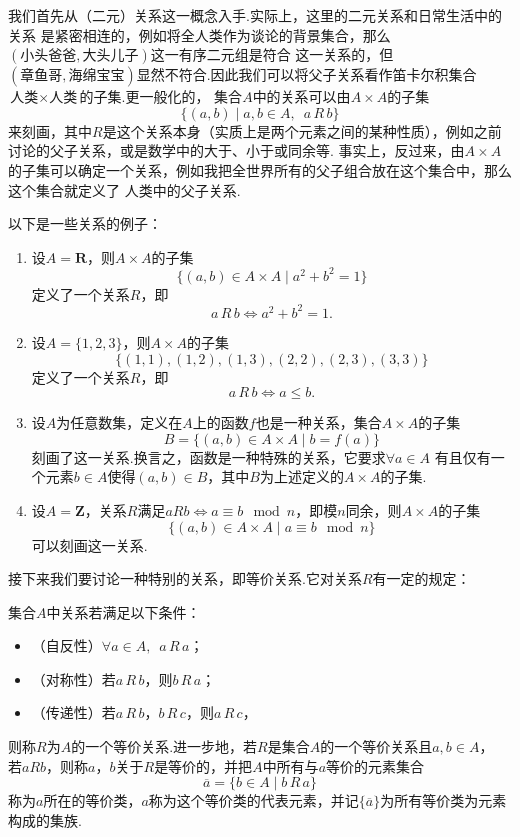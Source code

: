 我们首先从（二元）关系这一概念入手.实际上，这里的二元关系和日常生活中的关系
是紧密相连的，例如将全人类作为谈论的背景集合，那么$(\text{小头爸爸}, \text{大头儿子})$这一有序二元组是符合
这一关系的，但$(\text{章鱼哥}, \text{海绵宝宝})$显然不符合.因此我们可以将父子关系看作笛卡尔积集合$\text{人类}\times\text{人类}$的子集.更一般化的，
集合$A$中的关系可以由$A\times A$的子集
\[\{(a,b) \mid a,b\in A, \enspace a\,R\,b\}\]
来刻画，其中$R$是这个关系本身（实质上是两个元素之间的某种性质），例如之前讨论的父子关系，或是数学中的大于、小于或同余等.
事实上，反过来，由$A\times A$的子集可以确定一个关系，例如我把全世界所有的父子组合放在这个集合中，那么这个集合就定义了
人类中的父子关系.
\begin{example}
    以下是一些关系的例子：
    \begin{enumerate}[label=(\arabic*)]
        \item 设$A=\mathbf{R}$，则$A\times A$的子集
        \[\{(a,b)\in A\times A \mid a^2+b^2=1\}\]
        定义了一个关系$R$，即
        \[a\,R\,b \iff a^2+b^2=1.\]
        \item 设$A=\{1,2,3\}$，则$A\times A$的子集
        \[\{(1,1),(1,2),(1,3),(2,2),(2,3),(3,3)\}\]
        定义了一个关系$R$，即
        \[a\,R\,b \iff a\leqslant b.\]
        \item 设$A$为任意数集，定义在$A$上的函数$f$也是一种关系，集合$A\times A$的子集
        \[B=\{(a,b)\in A\times A \mid b=f(a)\}\]
        刻画了这一关系.换言之，函数是一种特殊的关系，它要求$\forall a\in A$
        有且仅有一个元素$b\in A$使得$(a,b)\in B$，其中$B$为上述定义的$A\times A$的子集.
        \item 设$A=\mathbf{Z}$，关系$R$满足$aRb\iff a\equiv b \mod n$，即模$n$同余，则$A\times A$的子集
        \[\{(a,b)\in A\times A \mid a\equiv b \mod n\}\]
        可以刻画这一关系.
    \end{enumerate}
\end{example}

接下来我们要讨论一种特别的关系，即等价关系.它对关系$R$有一定的规定：
\begin{definition}\label{def:1:等价关系}
    集合$A$中关系若满足以下条件：
    \begin{itemize}
        \item（自反性）$\forall a\in A, \enspace a\,R\,a$；

        \item（对称性）若$a\,R\,b$，则$b\,R\,a$；

        \item（传递性）若$a\,R\,b$，$b\,R\,c$，则$a\,R\,c$，
    \end{itemize}
    则称$R$为$A$的一个等价关系.进一步地，若$R$是集合$A$的一个等价关系且$a,b\in A$，
    若$aRb$，则称$a$，$b$关于$R$是等价的，并把$A$中所有与$a$等价的元素集合
    \[\overline{a}=\{b\in A \mid b\,R\,a\}\]
    称为$a$所在的等价类，$a$称为这个等价类的代表元素，并记$\{\overline{a}\}$为所有等价类为元素构成的集族.
\end{definition}

